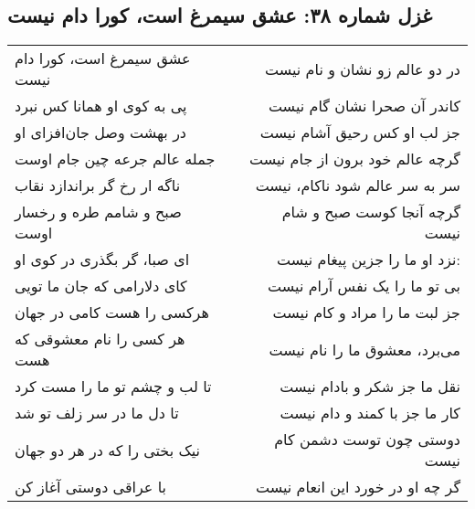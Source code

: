 \begin{center}
\section*{غزل شماره ۳۸: عشق سیمرغ است، کورا دام نیست}
\label{sec:038}
\begin{longtable}{l p{0.5cm} r}
عشق سیمرغ است، کورا دام نیست
&&
در دو عالم زو نشان و نام نیست
\\
پی به کوی او همانا کس نبرد
&&
کاندر آن صحرا نشان گام نیست
\\
در بهشت وصل جان‌افزای او
&&
جز لب او کس رحیق آشام نیست
\\
جمله عالم جرعه چین جام اوست
&&
گرچه عالم خود برون از جام نیست
\\
ناگه ار رخ گر براندازد نقاب
&&
سر به سر عالم شود ناکام، نیست
\\
صبح و شامم طره و رخسار اوست
&&
گرچه آنجا کوست صبح و شام نیست
\\
ای صبا، گر بگذری در کوی او
&&
نزد او ما را جزین پیغام نیست:
\\
کای دلارامی که جان ما تویی
&&
بی تو ما را یک نفس آرام نیست
\\
هرکسی را هست کامی در جهان
&&
جز لبت ما را مراد و کام نیست
\\
هر کسی را نام معشوقی که هست
&&
می‌برد، معشوق ما را نام نیست
\\
تا لب و چشم تو ما را مست کرد
&&
نقل ما جز شکر و بادام نیست
\\
تا دل ما در سر زلف تو شد
&&
کار ما جز با کمند و دام نیست
\\
نیک بختی را که در هر دو جهان
&&
دوستی چون توست دشمن کام نیست
\\
با عراقی دوستی آغاز کن
&&
گر چه او در خورد این انعام نیست
\\
\end{longtable}
\end{center}
